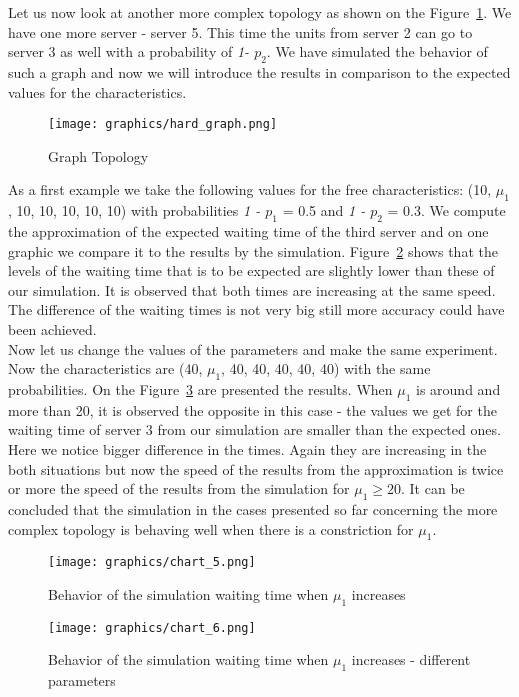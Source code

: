\documentclass[12pt]{article}
\theoremstyle{plain}
\begin{document}
Let us now look at another more complex topology as shown on the Figure~\ref{fig:hard_graph}.
We have one more server - server 5. This time the units from server 2 can go to
server 3 as well with a probability of \emph{1- $p_2$}. We have simulated the
behavior of such a graph and now we will introduce the results in comparison to
the expected values for the characteristics.

\begin{figure}
  \caption{Graph Topology}
  \texttt{[image: graphics/hard\_graph.png]}
  \label{fig:hard_graph}
\end{figure}

As a first example we take the following values for the free characteristics:
(10, $\mu_1$, 10, 10, 10, 10, 10) with probabilities \emph{1 - $p_1$} = 0.5 and
\emph{1 - $p_2$} = 0.3. We compute the approximation of the expected waiting
time of the third server and on one graphic we compare it to the results by the
simulation. Figure~\ref{fig:waiting_time1} shows that the levels of the waiting time that is to
be expected are slightly lower than these of our simulation. It is observed that
both times are increasing at the same speed. The difference of the waiting times
is not very big still more accuracy could have been achieved.\\
Now let us change the values of the parameters and make the same experiment. Now
the characteristics are (40, $\mu_1$, 40, 40, 40, 40, 40) with the same probabilities.
On the Figure~\ref{fig:waiting_time2} are presented the results. When $\mu_1$
is around and more than 20, it is observed the opposite in this case - the
values we get for the waiting time of server 3 from our simulation are smaller
than the expected ones. Here we notice bigger difference in the times. Again
they are increasing in the both situations but now the speed of the results
from the approximation is twice or more the speed of the results from the
simulation for $\mu_1 \ge 20$.  It can be concluded that the simulation in the
cases presented so far concerning the more complex topology is behaving well
when there is a constriction for $\mu_1$. 

\begin{figure}[h]
  \caption{Behavior of the simulation waiting time when $\mu_1$ increases}
  \texttt{[image: graphics/chart\_5.png]}
  \label{fig:waiting_time1}
\end{figure}

\begin{figure}[h]
  \caption{Behavior of the simulation waiting time when $\mu_1$ increases - different parameters}
  \texttt{[image: graphics/chart\_6.png]}
  \label{fig:waiting_time2}
\end{figure}
\end{document}
